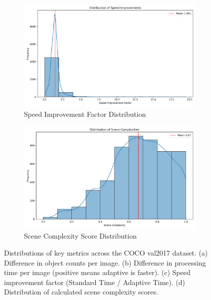 \documentclass{article}
\begin{document}
\begin{figure}[p]
    \vspace{1em} %
    
    \begin{subfigure}[b]{0.48\textwidth}
        \includegraphics[width=\linewidth]{figures/speed_improvement_distribution.png}
        \caption{Speed Improvement Factor Distribution}
        \label{fig:speed_dist}
    \end{subfigure}
    \hfill
    \begin{subfigure}[b]{0.48\textwidth}
        \includegraphics[width=\linewidth]{figures/complexity_distribution.png}
        \caption{Scene Complexity Score Distribution}
        \label{fig:complexity_dist}
    \end{subfigure}

    \caption{Distributions of key metrics across the COCO val2017 dataset. (a) Difference in object counts per image. (b) Difference in processing time per image (positive means adaptive is faster). (c) Speed improvement factor (Standard Time / Adaptive Time). (d) Distribution of calculated scene complexity scores.}
    \label{fig:dist_plots}
\end{figure}
\end{document}
